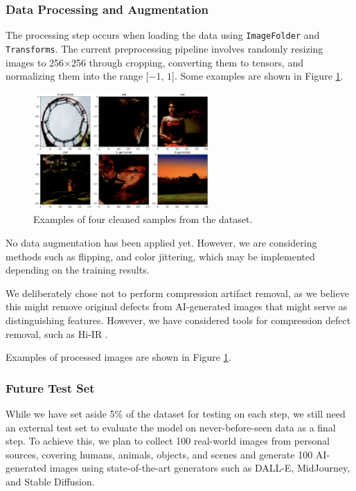 \documentclass{article} %
\begin{document}
\subsubsection{Data Processing and Augmentation}
The processing step occurs when loading the data using \texttt{ImageFolder} and \texttt{Transforms}. The current preprocessing pipeline involves randomly resizing images to 256×256 through cropping, converting them to tensors, and normalizing them into the range [$-1$, $1$]. Some examples are shown in Figure \ref{fig:cleaned_sample}.

\begin{figure}[h]
    \begin{center}
        \includegraphics[width=0.6\textwidth]{figs/data_examples_2by3.png}
    \end{center}
    \caption{Examples of four cleaned samples from the dataset.}
    \label{fig:cleaned_sample}
\end{figure}

No data augmentation has been applied yet. However, we are considering methods such as flipping, and color jittering, which may be implemented depending on the training results.

We deliberately chose not to perform compression artifact removal, as we believe this might remove original defects from AI-generated images that might serve as distinguishing features. However, we have considered tools for compression defect removal, such as Hi-IR \citep{li2024hierarchicalinformationflowgeneralized}.

Examples of processed images are shown in Figure \ref{fig:cleaned_sample}.


\subsubsection{Future Test Set}
While we have set aside 5\% of the dataset for testing on each step, we still need an external test set to evaluate the model on never-before-seen data as a final step. To achieve this, we plan to
collect 100 real-world images from personal sources, covering humans, animals, objects, and scenes and generate 100 AI-generated images using state-of-the-art generators such as DALL-E, MidJourney, and Stable Diffusion.
\end{document}
